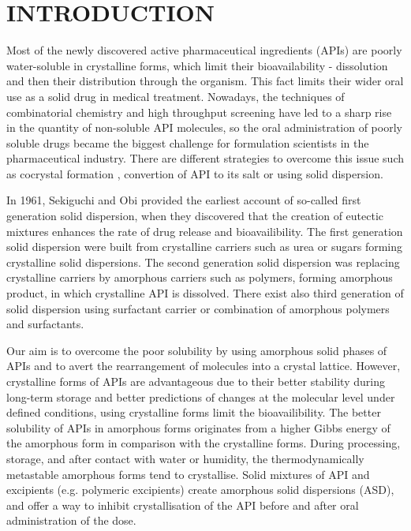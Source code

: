 \newpage
\section{INTRODUCTION}
\setcounter{page}{1}
\enlargethispage{\baselineskip}

Most of the newly discovered active pharmaceutical ingredients (APIs) are poorly water-soluble in crystalline forms, which limit their bioavailability - dissolution and then their distribution through the organism. This fact limits their wider oral use as a solid drug in medical treatment. Nowadays, the techniques of combinatorial chemistry and high throughput screening have led to a sharp rise in the quantity of non-soluble API molecules, so the oral administration of poorly soluble drugs became the biggest challenge for formulation scientists in the pharmaceutical industry. \cite{leuner_improving_2000} There are different strategies to overcome this issue such as cocrystal formation \cite{batisai_solubility_2021}, convertion of API to its salt \cite{huang_impact_2004} or using solid dispersion. \cite{srinarong_improved_2011} 

In 1961, Sekiguchi and Obi provided the earliest account of so-called first generation solid dispersion, when they discovered that the creation of eutectic mixtures enhances the rate of drug release and bioavailibility. The first generation solid dispersion were built from crystalline carriers such as urea or sugars forming crystalline solid dispersions. The second generation solid dispersion was replacing crystalline carriers by amorphous carriers such as polymers, forming amorphous product, in which crystalline API is dissolved. There exist also third generation of solid dispersion using surfactant carrier or combination of amorphous polymers and surfactants.~\cite{vasconcelos_solid_2007}

Our aim is to overcome the poor solubility by using amorphous solid phases of APIs and to avert the rearrangement of molecules into a crystal lattice. However, crystalline forms of APIs are advantageous due to their better stability during long-term storage and better predictions of changes at the molecular level under defined conditions, using crystalline forms limit the bioavailibility. \cite{caron_comparison_2011} The better solubility of APIs in amorphous forms originates from a higher Gibbs energy of the amorphous form in comparison with the crystalline forms. During processing, storage, and after contact with water or humidity, the thermodynamically metastable amorphous forms tend to crystallise. Solid mixtures of API and excipients (e.g. polymeric excipients) create amorphous solid dispersions (ASD), and offer a way to inhibit crystallisation of the API before and after oral administration of the dose. \cite{prudic_thermodynamic_2014}

